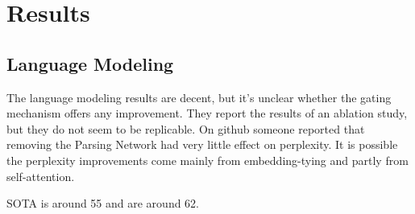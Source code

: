 \documentclass{article}
\begin{document}
\section{Results}
\subsection{Language Modeling}

The language modeling results are decent, but it's unclear whether the
gating mechanism offers any improvement.
They report the results of an ablation study, but they do not seem to be replicable.
On github someone reported that removing the Parsing Network had very little effect on perplexity.
It is possible the perplexity improvements come 
mainly from embedding-tying and partly from self-attention.

SOTA is around 55 and \citet{shen2018prpn} are around 62.
\end{document}
